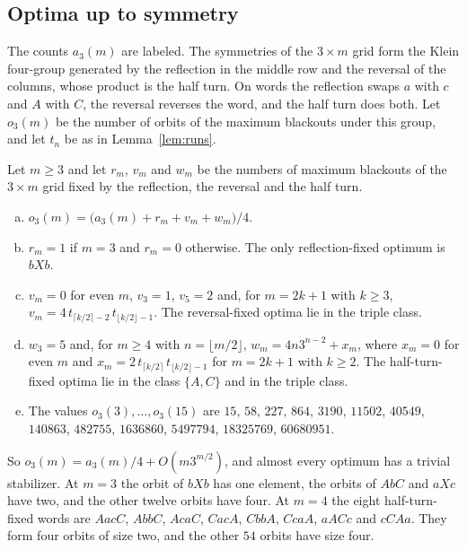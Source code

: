 \subsection{Optima up to symmetry}

The counts $a_3(m)$ are labeled. The symmetries of the $3\times m$ grid form the Klein
four-group generated by the reflection in the middle row and the reversal of the columns,
whose product is the half turn. On words the reflection swaps $a$ with $c$ and $A$ with $C$,
the reversal reverses the word, and the half turn does both. Let $o_3(m)$ be the number of
orbits of the maximum blackouts under this group, and let $t_n$ be as in Lemma~\ref{lem:runs}.

\begin{proposition}\label{prop:threeorbits}
Let $m\ge3$ and let $r_m$, $v_m$ and $w_m$ be the numbers of maximum blackouts of the
$3\times m$ grid fixed by the reflection, the reversal and the half turn.
\begin{enumerate}[(a)]
\item $o_3(m)=\bigl(a_3(m)+r_m+v_m+w_m\bigr)/4$.
\item $r_m=1$ if $m=3$ and $r_m=0$ otherwise. The only reflection-fixed optimum is $bXb$.
\item $v_m=0$ for even $m$, $v_3=1$, $v_5=2$ and, for $m=2k+1$ with $k\ge3$,
$v_m=4\,t_{\lceil k/2\rceil-2}\,t_{\lfloor k/2\rfloor-1}$. The reversal-fixed optima lie in
the triple class.
\item $w_3=5$ and, for $m\ge4$ with $n=\lfloor m/2\rfloor$,
$w_m=4n3^{n-2}+x_m$, where $x_m=0$ for even $m$ and
$x_m=2\,t_{\lceil k/2\rceil}\,t_{\lfloor k/2\rfloor-1}$ for $m=2k+1$ with $k\ge2$. The
half-turn-fixed optima lie in the class $\{A,C\}$ and in the triple class.
\item The values $o_3(3),\dots,o_3(15)$ are $15$, $58$, $227$, $864$, $3190$, $11502$,
$40549$, $140863$, $482755$, $1636860$, $5497794$, $18325769$, $60680951$.
\end{enumerate}
\end{proposition}

So $o_3(m)=a_3(m)/4+O(m3^{m/2})$, and almost every optimum has a trivial stabilizer. At
$m=3$ the orbit of $bXb$ has one element, the orbits of $AbC$ and $aXc$ have two, and the
other twelve orbits have four. At $m=4$ the eight half-turn-fixed words are $AacC$, $AbbC$,
$AcaC$, $CacA$, $CbbA$, $CcaA$, $aACc$ and $cCAa$. They form four orbits of size two, and the
other $54$ orbits have size four.

